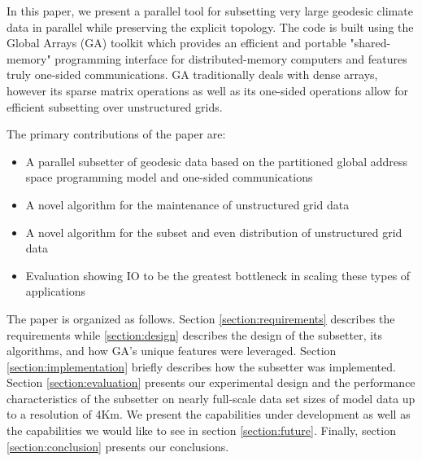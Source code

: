 In this paper, we present a parallel tool for subsetting very large geodesic
climate data in parallel while preserving the explicit topology.  The code is
built using the Global Arrays (GA) toolkit which provides an efficient and
portable "shared-memory" programming interface for distributed-memory
computers and features truly one-sided communications.\cite{GA}  GA
traditionally deals with dense arrays, however its sparse matrix operations as
well as its one-sided operations allow for efficient subsetting over
unstructured grids.

The primary contributions of the paper are:
\begin{itemize}
\item A parallel subsetter of geodesic data based on the partitioned global address space programming model and one-sided communications
\item A novel algorithm for the maintenance of unstructured grid data
\item A novel algorithm for the subset and even distribution of unstructured grid data
\item Evaluation showing IO to be the greatest bottleneck in scaling these types of applications
\end{itemize}

The paper is organized as follows.  Section \ref{section:requirements}
describes the requirements while \ref{section:design} describes the design of
the subsetter, its algorithms, and how GA's unique features were leveraged.
Section \ref{section:implementation} briefly describes how the subsetter was
implemented.  Section \ref{section:evaluation} presents our experimental design
and the performance characteristics of the subsetter on nearly full-scale data
set sizes of model data up to a resolution of 4Km.  We present the
capabilities under development as well as the capabilities we would like to
see in section \ref{section:future}.  Finally, section
\ref{section:conclusion} presents our conclusions.
